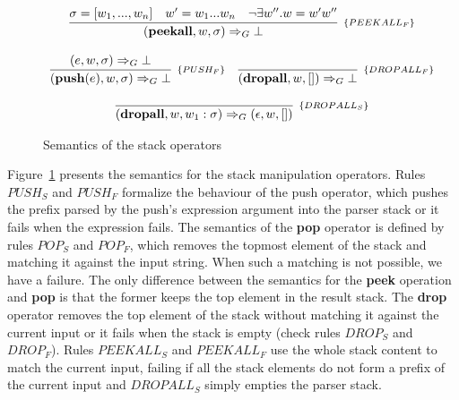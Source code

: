 \documentclass[preprint,12pt]{elsarticle}
\theoremstyle{definition}
\begin{document}
\begin{figure}[h!]
\[\begin{array}{cc}
      \multicolumn{2}{c}{
        \infer[_{\{PEEKALL_F\}}]
              {(\mathbf{peekall},w,\sigma)\Rightarrow_G \bot}
              {\sigma = [w_1, ..., w_n] & w' = w_1...w_n & \neg \exists w'' . w = w'w''}
      }\\ \\
         \infer[_{\{PUSH_F\}}]
              {(\mathbf{push}(e),w,\sigma)\Rightarrow_G \bot}
              {(e,w,\sigma)\Rightarrow_G \bot} &
             \infer[_{\{DROPALL_F\}}]
                   {(\mathbf{dropall}, w, [])\Rightarrow_G \bot}
                   {}
          \\ \\
          \multicolumn{2}{c}{
           \infer[_{\{DROPALL_S\}}]
                 {(\mathbf{dropall}, w, w_1 : \sigma)\Rightarrow_G (\epsilon, w, [])}
                 {}
          }
  \end{array}
  \]
  \caption{Semantics of the stack operators}
  \label{fig:newsemantics}
\end{figure}

Figure~\ref{fig:newsemantics} presents the semantics for the stack manipulation operators.
Rules $PUSH_S$ and $PUSH_F$ formalize the behaviour of the push operator, which pushes the
prefix parsed by the push's expression argument into the parser stack or it fails when
the expression fails. The semantics of the \textbf{pop} operator is defined by rules
$POP_S$ and $POP_F$, which removes the topmost element of the stack and matching it
against the input string. When such a matching is not possible, we have a failure.
The only difference between the semantics for the \textbf{peek} operation and \textbf{pop}
is that the former keeps the top element in the result stack.
The \textbf{drop} operator removes the top element of the stack without matching it
against the current input or it fails when the stack is empty (check rules $DROP_S$ and
$DROP_F$). Rules $PEEKALL_S$ and $PEEKALL_F$ use the whole stack content to match
the current input, failing if all the stack elements do not form a prefix of the current
input and $DROPALL_S$ simply empties the parser stack.
\end{document}

